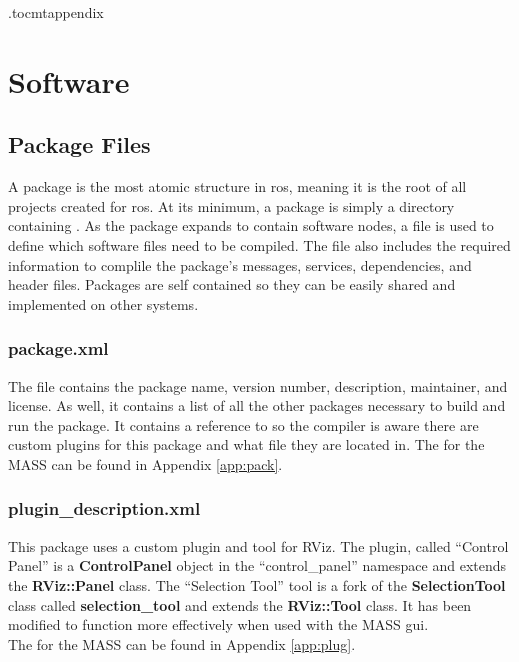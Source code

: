 \appendix
\etocdepthtag.toc{mtappendix}
\chapter{Software}
\label{chapp:code}
\section{Package Files}

A package is the most atomic structure in \acrshort{ros}, meaning it is the root of all projects created for \acrshort{ros}. At its minimum, a package is simply a directory containing . As the package expands to contain software nodes, a  file is used to define which software files need to be compiled. The  file also includes the required information to complile the package's messages, services, dependencies, and header files. Packages are self contained so they can be easily shared and implemented on other systems.\\

\subsection{package.xml}
The file  contains the package name, version number, description, maintainer, and license. As well, it contains a list of all the other packages necessary to build and run the package. It contains a reference to  so the compiler is aware there are custom plugins for this package and what file they are located in.
The  for the MASS can be found in Appendix \ref{app:pack}.
\subsection{plugin\_description.xml}
This package uses a custom plugin and tool for RViz. The plugin, called ``Control Panel'' is a \textbf{ControlPanel} object in the ``control\_panel'' namespace and extends the \textbf{RViz::Panel} class. The ``Selection Tool'' tool is a fork of the \textbf{SelectionTool} class called \textbf{selection\_tool} and extends the \textbf{RViz::Tool} class. It has been modified to function more effectively when used with the MASS \acrshort{gui}.\\

The  for the MASS can be found in Appendix \ref{app:plug}.
